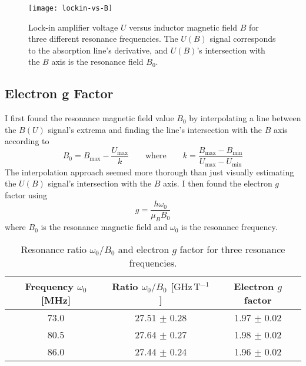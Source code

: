 \documentclass[11pt, a4paper]{article}
\newcommand{\eqtext}[1]{\qquad \text{#1} \qquad}
\begin{document}
\begin{figure}
	\centering
	\texttt{[image: lockin-vs-B]}
	\caption{Lock-in amplifier voltage $ U $ versus inductor magnetic field $ B $ for three different resonance frequencies. The $ U(B) $ signal corresponds to the absorption line's derivative, and $ U(B) $'s intersection with the $ B $ axis is the resonance field $ B_{0} $.}
	\label{elespinres:fig:absorption-line-derivative}
\end{figure}


\subsection{Electron g Factor}
I first found the resonance magnetic field value $ B_{0} $ by interpolating a line between the $ B(U) $ signal's extrema and finding the line's intersection with the $ B $ axis according to
\begin{equation*}
	B_{0} = B_{\text{max}} - \frac{U_{\text{max}}}{k} \eqtext{where} k = \frac{B_{\text{max}} - B_{\text{min}}}{U_{\text{max}} - U_{\text{min}}}
\end{equation*}
The interpolation approach seemed more thorough than just visually estimating the $ U(B) $ signal's intersection with the $ B $ axis. I then found the electron $ g $ factor using
\begin{equation*}
	g = \frac{h \omega_{0}}{\mu_{B}B_{0}}
\end{equation*}
where $ B_{0} $ is the resonance magnetic field and $ \omega_{0} $ is the resonance frequency.


\begin{table}[h]
\begin{center}
 \begin{tabular}{c|c|c}
     Frequency $ \omega_{0} $ [\si{\mega \hertz}] & Ratio $ \omega_{0}/B_{0} $ [$ \si{\giga \hertz\, \tesla^{-1}} $] & Electron $ g $ factor  \\
     \hline
     73.0 & 27.51 $ \pm $ 0.28 & 1.97 $ \pm $ 0.02 \\
     80.5 & 27.64 $ \pm $ 0.27 & 1.98 $ \pm $ 0.02 \\
     86.0 & 27.44 $ \pm $ 0.24 & 1.96 $ \pm $ 0.02
	\end{tabular}
	\caption{Resonance ratio $ \omega_{0}/ B_{0} $ and electron $ g $ factor for three resonance frequencies. }
	\label{elespinres:table:ratio-g-factor}
\end{center}
\end{table}
	
\end{document}
